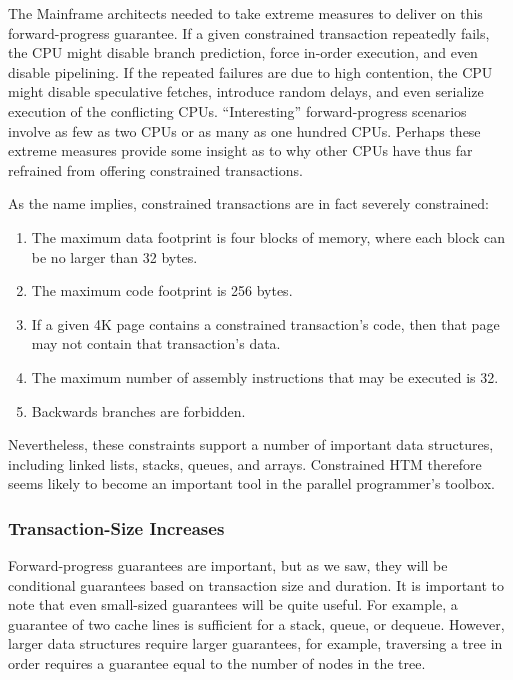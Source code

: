 The Mainframe architects needed to take extreme measures to deliver on
this forward-progress guarantee.
If a given constrained transaction repeatedly fails, the CPU
might disable branch prediction, force in-order execution, and even
disable pipelining.
If the repeated failures are due to high contention, the CPU might
disable speculative fetches, introduce random delays, and even
serialize execution of the conflicting CPUs.
``Interesting'' forward-progress scenarios involve as few as two CPUs
or as many as one hundred CPUs.
Perhaps these extreme measures provide some insight as to why other CPUs
have thus far refrained from offering constrained transactions.

As the name implies, constrained transactions are in fact severely constrained:

\begin{enumerate}
\item	The maximum data footprint is four blocks of memory,
	where each block can be no larger than 32 bytes.
\item	The maximum code footprint is 256 bytes.
\item	If a given 4K page contains a constrained transaction's code,
	then that page may not contain that transaction's data.
\item	The maximum number of assembly instructions that may be executed
	is 32.
\item	Backwards branches are forbidden.
\end{enumerate}

Nevertheless, these constraints support a number of important data structures,
including linked lists, stacks, queues, and arrays.
Constrained HTM therefore seems likely to become an important tool in
the parallel programmer's toolbox.

\subsubsection{Transaction-Size Increases}
\label{sec:future:Transaction-Size Increases}

Forward-progress guarantees are important, but as we saw, they will
be conditional guarantees based on transaction size and duration.
It is important to note that even small-sized guarantees will be
quite useful.
For example,
a guarantee of two cache lines is sufficient for a stack, queue, or dequeue.
However, larger data structures require larger guarantees, for example,
traversing a tree in order requires a guarantee equal to the number
of nodes in the tree.

